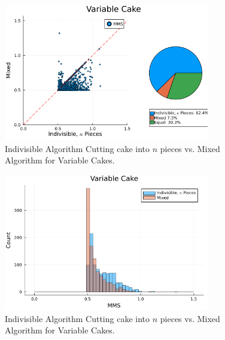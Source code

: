 \begin{figure}
    \centering
    \includegraphics[width=0.8\textwidth]{assets/plots/scatter_indivisible_n_pieces_vs_mixed_variable_cake.png}
    \caption{Indivisible Algorithm Cutting cake into $n$ pieces vs. Mixed Algorithm for Variable Cakes.}
    \label{fig:scatter_indivisible_n_pieces_vs_mixed_variable_cake}
\end{figure}
\begin{figure}
    \centering
    \includegraphics[width=0.8\textwidth]{assets/plots/histogram_indivisible_n_pieces_vs_mixed_variable_cake.png}
    \caption{Indivisible Algorithm Cutting cake into $n$ pieces vs. Mixed Algorithm for Variable Cakes.}
    \label{fig:histogram_indivisible_n_pieces_vs_mixed_variable_cake}
\end{figure}




















